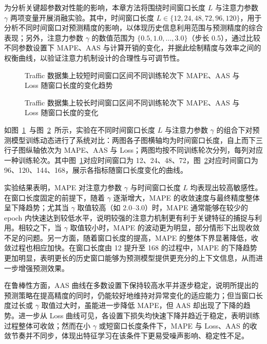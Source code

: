 为分析关键超参数对性能的影响，本章方法将围绕时间窗口长度 \(L\) 与注意力参数 \(\gamma\) 两项变量开展消融实验。其中，时间窗口长度 \(L \in \{12, 24, 48, 72, 96, 120\}\)，用于分析不同时间窗口对预测精度的影响，以体现历史信息利用范围与预测精度的综合表现；另外，注意力参数 \(\gamma\) 的数值范围为 \(\{0.5, 1.0, \ldots, 3.0\}\)（步长 0.5），通过比较不同参数设置下 MAPE、AAS 与计算开销的变化，并据此绘制精度与效率之间的权衡曲线，以验证注意力机制设计的合理性与可调节性。

\begin{figure}[htbp]
\centering
{}
\caption{Traffic 数据集上较短时间窗口区间不同训练轮次下 MAPE、AAS 与 Loss 随窗口长度的变化趋势}
\label{fig:ch3-ablation-rho-epochs}
\end{figure}

\begin{figure}[htbp]
\centering
{}
\caption{Traffic 数据集上较长时间窗口区间不同训练轮次下 MAPE、AAS 与 Loss 随窗口长度的变化}
\label{fig:ch3-ablation-alpha-epochs}
\end{figure}

如图~\ref{fig:ch3-ablation-rho-epochs}~与图~\ref{fig:ch3-ablation-alpha-epochs}~所示，实验在不同时间窗口长度 \(L\) 与注意力参数 \(\gamma\) 的组合下对预测模型训练动态进行了系统对比：两图各子图横轴均为时间窗口长度，自上而下三行子图纵轴依次为 MAPE、AAS 与 Loss；两图均按不同训练轮次分列，每列对应一种训练轮次。其中图~\ref{fig:ch3-ablation-rho-epochs}对应时间窗口为 12、24、48、72，图~\ref{fig:ch3-ablation-alpha-epochs}对应时间窗口为 96、120、144、168，展示各指标随窗口长度变化的曲线。

实验结果表明，MAPE 对注意力参数 \(\gamma\) 与时间窗口长度 \(L\) 均表现出较高敏感性。在窗口长度固定的前提下，随着 \(\gamma\) 逐渐增大，MAPE 的收敛速度与最终精度整体呈下降趋势；尤其当 \(\gamma\) 取值较高（如 2.0--3.0）时，MAPE 通常能够在较少的 epoch 内快速达到较低水平，说明较强的注意力机制更有利于关键特征的捕捉与利用。相较之下，当 \(\gamma\) 取值较小时，MAPE 的波动更为明显，部分情形下出现收敛不足的问题。另一方面，随着窗口长度的提高，MAPE 的整体下界显著降低，收敛过程也相应加快。在窗口长度由 12 提升至 168 的过程中，MAPE 的下降趋势更加明显，表明更长的历史窗口能够为预测模型提供更充分的上下文信息，从而进一步增强预测效果。

在鲁棒性方面，AAS 曲线在多数设置下保持较高水平并逐步稳定，说明所提出的预测策略在提高精度的同时，仍能较好地维持对异常变化的适应能力；但当窗口长度过长或 \(\gamma\) 取值过大时，虽能进一步降低 MAPE，但 AAS 却出现了下降的趋势。进一步从 Loss 曲线可见，各设置下损失均快速下降并趋近于稳定，表明训练过程整体可收敛；然而在小 \(\gamma\) 或短窗口长度条件下，MAPE 与 Loss、AAS 的收敛节奏并不同步，体现出特征学习在该条件下更易受噪声影响、稳定性不足。

